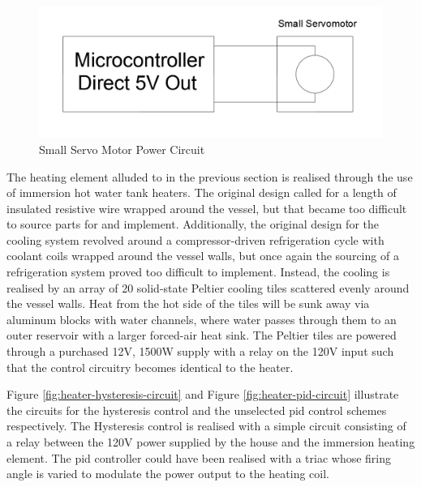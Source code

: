 \documentclass{article}
\begin{document}
\begin{figure}[H]
\begin{center}
\includegraphics[scale=0.30]{servo-small-actuator-circuit.png}
\caption{Small Servo Motor Power Circuit}
\label{fig:servo-small-actuator-circuit}
\end{center}
\end{figure}

The heating element alluded to in the previous section is realised through the use of immersion hot water tank heaters. The original design called for a length of insulated resistive wire wrapped around the vessel, but that became too difficult to source parts for and implement. Additionally, the original design for the cooling system revolved around a compressor-driven refrigeration cycle with coolant coils wrapped around the vessel walls, but once again the sourcing of a refrigeration system proved too difficult to implement. Instead, the cooling is realised by an array of 20 solid-state Peltier cooling tiles scattered evenly around the vessel walls. Heat from the hot side of the tiles will be sunk away via aluminum blocks with water channels, where water passes through them to an outer reservoir with a larger forced-air heat sink. The Peltier tiles are powered through a purchased 12V, 1500W supply with a relay on the 120V input such that the control circuitry becomes identical to the heater.

\noindent Figure \ref{fig:heater-hysteresis-circuit} and Figure \ref{fig:heater-pid-circuit} illustrate the circuits for the hysteresis control and the unselected \gls{pid} control schemes respectively. The Hysteresis control is realised with a simple circuit consisting of a relay between the 120V power supplied by the house and the immersion heating element. The \gls{pid} controller could have been realised with a triac whose firing angle is varied to modulate the power output to the heating coil.
\end{document}
